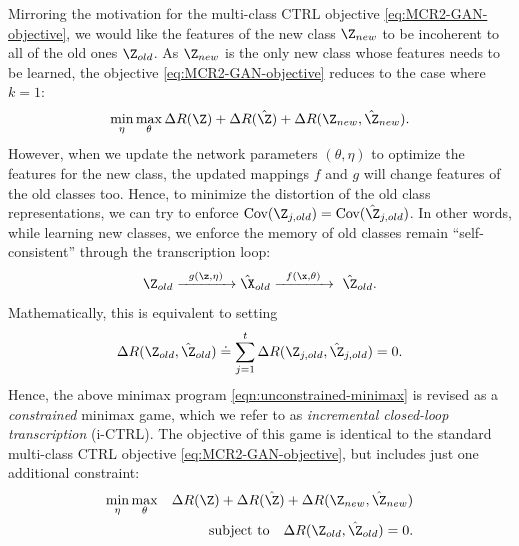 \documentclass[../../book-main.tex]{subfiles}
\begin{document}
Mirroring the motivation for the multi-class CTRL objective \eqref{eq:MCR2-GAN-objective}, we would like the features of the new class $\Z_{new}$ to be incoherent to all of the old ones $\Z_{old}$. As $\Z_{new}$ is the only new class whose features needs to be learned, the objective \eqref{eq:MCR2-GAN-objective} reduces to the case where $k=1$:
\begin{equation}
\min_\eta \max_\theta \Delta{R(\Z)}+\Delta{R(\hat{\Z})}+\Delta{R(\Z_{new},\hat{\Z}_{new})}.
\label{eqn:unconstrained-minimax}
\end{equation}
However, when we update the network parameters $(\theta, \eta)$ to optimize the features for the new class, the updated mappings $f$ and $g$ will change features of the old classes too. Hence, to minimize the distortion of the old class representations, we can try to enforce $\mbox{Cov}(\Z_{j,old}) = \mbox{Cov}(\hat{\Z}_{j,old})$. In other words, while learning new classes, we enforce the memory of old classes remain ``self-consistent'' through the transcription loop:
\begin{equation}
\Z_{old} \xrightarrow{\hspace{2mm} g(\z,\eta) \hspace{2mm}} \hat \X_{old} \xrightarrow{\hspace{2mm} f(\x, \theta)\hspace{2mm}} \ \hat \Z_{old}.
\end{equation}
Mathematically, this is equivalent to setting 
$$\Delta R(\Z_{old},\hat{\Z}_{old}) \doteq  \sum_{j=1}^t \Delta R(\Z_{j,old},\hat{\Z}_{j,old}) = 0.$$  
Hence, the above minimax program \eqref{eqn:unconstrained-minimax} is revised as a {\em constrained} minimax game, which we refer to as  {\em incremental closed-loop transcription} (i-CTRL).
The objective of this game is identical to the standard multi-class CTRL objective \eqref{eq:MCR2-GAN-objective}, but includes just one additional constraint:
\begin{eqnarray}
\min_\eta \max_\theta  &&\Delta{R(\Z)}+\Delta{R(\hat{\Z})}+\Delta{R(\Z_{new},\hat{\Z}_{new})} \nonumber\\
&& \mbox{subject to} \quad  \Delta R(\Z_{old},\hat{\Z}_{old}) = 0.
\label{eqn:constrained-minimax}
\end{eqnarray}
\end{document}
